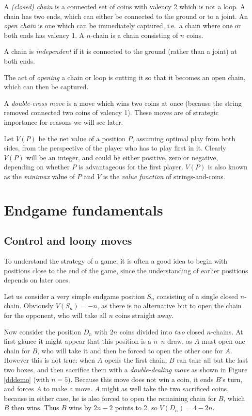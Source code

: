 \documentclass[a4paper,twocolumn]{article}
\begin{document}
A \emph{(closed) chain} is a connected set of coins with valency 2
which is not a loop. A chain has two ends, which can either be
connected to the ground or to a joint. An \emph{open chain} is one
which can be immediately captured, i.e.\ a chain where one or both ends
has valency 1. A $n$-chain is a chain consisting of $n$ coins.

A chain is \emph{independent} if it is connected to the ground (rather
than a joint) at both ends.

The act of \emph{opening} a chain or loop is cutting it so that it
becomes an open chain, which can then be captured.

A \emph{double-cross move} is a move which wins two coins at once
(because the string removed connected two coins of valency 1). These
moves are of strategic importance for reasons we will see later.

Let $V(P)$ be the net value of a position $P$, assuming optimal play
from both sides, from the perspective of the player who has to play
first in it. Clearly $V(P)$ will be an integer, and could be either
positive, zero or negative, depending on whether $P$ is advantageous
for the first player. $V(P)$ is also known as the \emph{minimax} value
of $P$ and $V$ is the \emph{value function} of strings-and-coins.

\section{Endgame fundamentals}

\subsection{Control and loony moves}

To understand the strategy of a game, it is often a good idea to begin
with positions close to the end of the game, since the understanding
of earlier positions depends on later ones.

Let us consider a very simple endgame position $S_n$ consisting of a
single closed $n$-chain. Obviously $V(S_n)=-n$, as there is no
alternative but to open the chain for the opponent, who will take all
$n$ coins straight away.

Now consider the position $D_n$ with $2n$ coins divided into
\emph{two} closed $n$-chains. At first glance it might appear that
this position is a $n$--$n$ draw, as $A$ must open one chain for $B$,
who will take it and then be forced to open the other one for
$A$. However this is not true: when $A$ opens the first chain, $B$ can
take all but the last two boxes, and then sacrifice them with a
\emph{double-dealing move} as shown in Figure \ref{dddemo} (with
$n=5$). Because this move does not win a coin, it ends $B$'s turn, and
forces $A$ to make a move. $A$ might as well take the two sacrificed
coins, because in either case, he is also forced to open the remaining
chain for $B$, which $B$ then wins. Thus $B$ wins by $2n - 2$ points
to 2, so $V(D_n) = 4-2n$.
\end{document}

